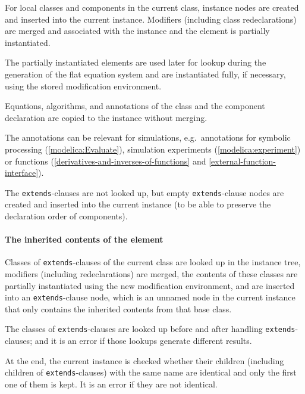 For local classes and components in the current class, instance nodes are created and inserted into the current instance.
Modifiers (including class redeclarations) are merged and associated with the instance and the element is partially instantiated.

\begin{nonnormative}
The partially instantiated elements are used later for lookup during the generation of the flat equation system and are instantiated fully, if necessary, using the stored modification environment.
\end{nonnormative}

Equations, algorithms, and annotations of the class and the component declaration are copied to the instance without merging.

\begin{nonnormative}
The annotations can be relevant for simulations, e.g.\ annotations for symbolic processing (\cref{modelica:Evaluate}), simulation experiments (\cref{modelica:experiment}) or functions (\cref{derivatives-and-inverses-of-functions} and \cref{external-function-interface}).
\end{nonnormative}

The \lstinline!extends!-clauses are not looked up, but empty \lstinline!extends!-clause nodes are created and inserted into the current instance (to be able to preserve the declaration order of components).

\paragraph*{The inherited contents of the element}\label{the-inherited-contents-of-the-element}

Classes of \lstinline!extends!-clauses of the current class are looked up in the instance tree, modifiers (including redeclarations) are merged, the contents of these classes are partially instantiated using the new modification environment, and are inserted into an \lstinline!extends!-clause node, which is an unnamed node in the current instance that only contains the inherited contents from that base class.

The classes of \lstinline!extends!-clauses are looked up before and after handling \lstinline!extends!-clauses; and it is an error if those lookups generate different results.

At the end, the current instance is checked whether their children (including children of \lstinline!extends!-clauses) with the same name are identical and only the first one of them is kept.
It is an error if they are not identical.

